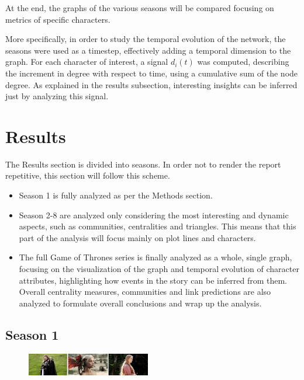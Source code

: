 \documentclass[10pt,twocolumn,letterpaper]{article}
\begin{document}
At the end, the graphs of the various seasons will be compared focusing on metrics of specific characters.

More specifically, in order to study the temporal evolution of the network, the seasons were used as a timestep, effectively adding a temporal dimension to the graph. For each character of interest, a signal $d_i(t)$ was computed, describing the increment in degree with respect to time, using a cumulative sum of the node degree. As explained in the results subsection, interesting insights can be inferred just by analyzing this signal.

\section{Results}

The Results section is divided into seasons. In order not to render the report repetitive, this section will follow this scheme.

\begin{itemize}
    \item Season 1 is fully analyzed as per the Methods section.
    \item Season 2-8 are analyzed only considering the most interesting and dynamic aspects, such as communities, centralities and triangles. This means that this part of the analysis will focus mainly on plot lines and characters. 
    \item The full Game of Thrones series is finally analyzed as a whole, single graph, focusing on the visualization of the graph and temporal evolution of character attributes, highlighting how events in the story can be inferred from them. Overall centrality measures, communities and link predictions are also analyzed to formulate overall conclusions and wrap up the analysis.
\end{itemize}

\subsection{Season 1}

\begin{figure}[!h]
    \centering
    \includegraphics[width=0.48\textwidth]{img/s1/frames_s1.jpg}
\end{figure}
\end{document}
